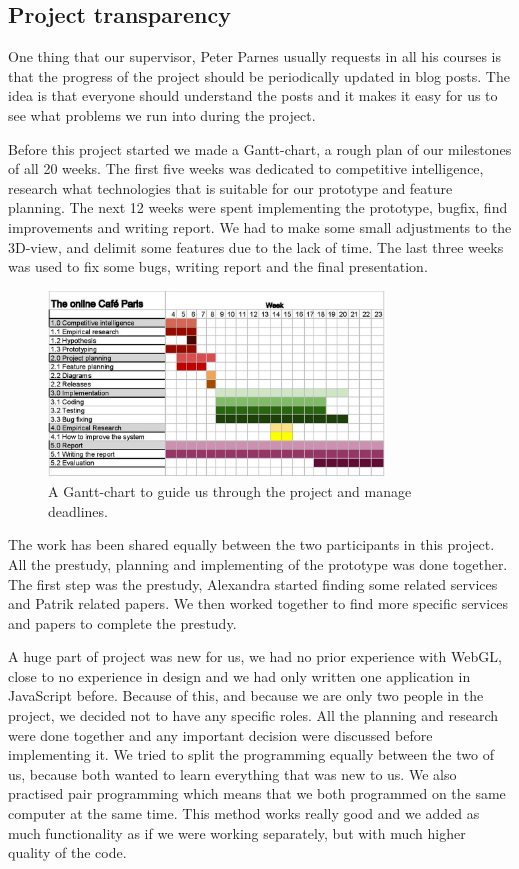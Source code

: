 \documentclass[12pt, titlepage]{article}
\begin{document}
\subsection{Project transparency}
One thing that our supervisor, Peter Parnes usually requests in all his courses is that the progress of the project should be periodically updated in blog posts\cite{37}. The idea is that everyone should understand the posts and it makes it easy for us to see what problems we run into during the project.

Before this project started we made a Gantt-chart, a rough plan of our milestones of all 20 weeks. The first five weeks was dedicated to competitive intelligence, research what technologies that is suitable for our prototype and feature planning. The next 12 weeks were spent implementing the prototype, bugfix, find improvements and writing report. We had to make some small adjustments to the 3D-view, and delimit some features due to the lack of time. The last three weeks was used to fix some bugs, writing report and the final presentation.
\begin{figure}[H]
  \centering
	\includegraphics[width=0.8\textwidth,keepaspectratio]{grovplanering.jpg}
  \caption{A Gantt-chart to guide us through the project and manage deadlines.}
\end{figure}
The work has been shared equally between the two participants in this project. All the prestudy, planning and implementing of the prototype was done together. The first step was the prestudy, Alexandra started finding some related services and Patrik related papers. We then worked together to find more specific services and papers to complete the prestudy.

A huge part of project was new for us, we had no prior experience with WebGL, close to no experience in design and we had only written one application in JavaScript before. Because of this, and because we are only two people in the project, we decided not to have any specific roles. All the planning and research were done together and any important decision were discussed before implementing it. We tried to split the programming equally between the two of us, because both wanted to learn everything that was new to us. We also practised pair programming which means that we both programmed on the same computer at the same time. This method works really good and we added as much functionality as if we were working separately, but with much higher quality of the code.
\end{document}
